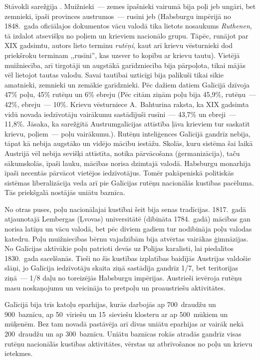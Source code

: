 \documentclass[twoside,a5paper,12pt,fleqn,openany]{extbook}
\newcommand{\detxti}[1]{\textit{\textgerman{#1}}}
\newcommand{\lttxti}[1]{\textit{\textlithuanian{#1}}}
\begin{document}
Stāvokli sarežģīja . Muižnieki~--- zemes īpašnieki vairumā bija poļi jeb ungāri, bet zemnieki, īpaši provinces austrumos~--- rusīni jeb  (Habsburgu impērijā no 1848.~gada oficiālajos dokumentos vācu valodā tika lietots nosaukums \detxti{Ruthenen}, tā izdalot atsevišķu no poļiem un krieviem nacionālo grupu. Tāpēc, runājot par XIX gadsimtu, autors lieto terminu \lttxti{rutēņi}, kaut arī krievu vēsturnieki dod priekšroku terminam ,,rusīni'', kas uzsver to kopību ar krievu tautu). Vietējā muižniecība, arī tirgotāji un augstākā garīdzniecība bija pārpoļota, tikai mājās vēl lietojot tautas valodu. Savai tautībai uzticīgi bija palikuši tikai sīkie amatnieki, zemnieki un zemākie garīdznieki. Pēc dažiem datiem Galīcijā dzīvoja 47\% poļu, 45\% rutēņu un 6\% ebreju (Pēc citām ziņām poļu bija 45,9\%, rutēņu~--- 42\%, ebreju~--- 10\%. Krievu vēsturniece A.~Bahturina raksta, ka XIX gadsimta vidū novada iedzīvotāju vairākumu sastādījuši rusīni~--- 43,7\% un ebreji~--- 11,8\%. Jāsaka, ka sarežģītā Austrumgalīcijas attīstība ļāva krieviem tur saskatīt krievu, poļiem~--- poļu vairākumu.). Rutēņu inteliģences Galīcijā gandrīz nebija, tāpat kā nebija augstāko un vidējo mācību iestāžu. Skolās, kuru sistēma šai laikā Austrijā vēl nebija sevišķi attīstīta, notika pārvācošana (ģermanizācija), taču sākumskolās, īpaši lauku, mācības norisa dzimtajā valodā. Habsburgu monarhija īpaši necentās pārvācot vietējos iedzīvotājus. Tomēr pakāpeniskā politiskās sistēmas liberalizācija veda arī pie Galīcijas rutēņu nacionālās kustības pacēluma. Tās priekšgalā nostājās uniātu baznīca.

No otras puses, poļu nacionālajai kustībai šeit bija senas tradīcijas. 1817.~gadā atjaunotajā Lembergas (Ļvovas) universitātē (dibināta 1784.~gadā) mācības gan norisa latīņu un vācu valodā, bet pēc diviem gadiem tur nodibināja poļu valodas katedru. Poļu muižniecības bērnu vajadzībām bija atvērtas vairākas ģimnāzijas. No Galīcijas aktīvākie poļu patrioti devās uz Polijas karalisti, lai piedalītos 1830.~gada sacelšanās. Tieši no šīs kustības izplatības baidījās Austrijas valdošie slāņi, jo Galīcija iedzīvotāju skaita ziņā sastādīja gandrīz 1/7, bet teritorijas ziņā~--- 1/8 daļu no toreizējās Habsburgu impērijas. Austrieši ievēroja rutēņu masu noskaņojumu un veicināja to pretpoļu un proaustriešu aktivitātes.

Galīcijā bija trīs katoļu eparhijas, kurās darbojās ap 700~draudžu un 900~baznīcu, ap 50~vīriešu un 15~sieviešu klosteru ar ap 500~mūkiem un mūķenēm. Bez tam novadā pastāvēja arī divas uniātu eparhijas ar vairāk nekā 200~draudžu un ap 300~baznīcu. Uniātu baznīcas rokās atradās gandrīz visas rutēņu nacionālās kustības aktivitātes, vērstas uz atbrīvošanos no poļu un krievu ietekmes.
\end{document}
